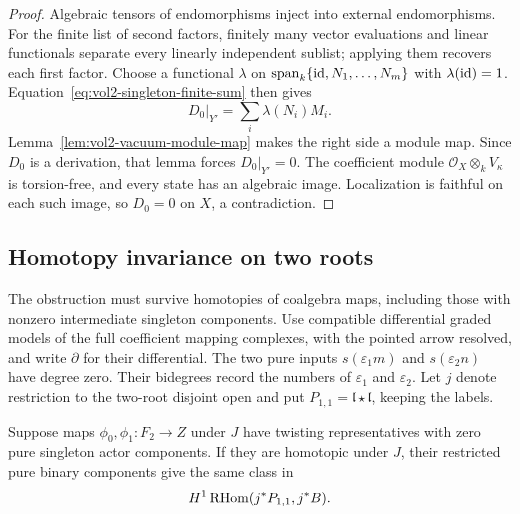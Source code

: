 \begin{proof}
Algebraic tensors of endomorphisms inject into external
endomorphisms. For the finite list of second factors, finitely
many vector evaluations and linear functionals separate every
linearly independent sublist; applying them recovers each first
factor. Choose a functional $\lambda$ on
$\operatorname{span}_k\{\mathrm{id},N_1,\ldots,N_m\}$ with
$\lambda(\mathrm{id})=1$. Equation~\eqref{eq:vol2-singleton-finite-sum}
then gives
\[
 D_0|_{Y'}=\sum_i\lambda(N_i)M_i.
\]
Lemma~\ref{lem:vol2-vacuum-module-map} makes the right side a
module map. Since $D_0$ is a derivation, that lemma forces
$D_0|_{Y'}=0$.
The coefficient module $\mathcal O_X\otimes_kV_\kappa$ is
torsion-free, and every state has an algebraic image.
Localization is faithful on each such image, so $D_0=0$ on $X$,
a contradiction.
\end{proof}

\subsection{Homotopy invariance on two roots}

The obstruction must survive homotopies of coalgebra maps,
including those with nonzero intermediate singleton components.
Use compatible differential graded models of the full coefficient
mapping complexes, with the pointed arrow resolved, and write
$\partial$ for their differential.
The two pure inputs $s(\varepsilon_1m)$ and
$s(\varepsilon_2n)$ have degree zero. Their bidegrees record the
numbers of $\varepsilon_1$ and $\varepsilon_2$.
Let $j$ denote restriction to the two-root disjoint open and put
$P_{1,1}=\mathfrak l\star\mathfrak l$, keeping the labels.

\begin{lemma}\label{lem:vol2-binary-homotopy}
Suppose maps $\phi_0,\phi_1:F_2\to Z$ under $J$ have twisting
representatives with zero pure singleton actor components.
If they are homotopic under $J$, their restricted pure binary
components give the same class in
\[
 H^1\operatorname{RHom}(j^*P_{1,1},j^*B).
\]
\end{lemma}

